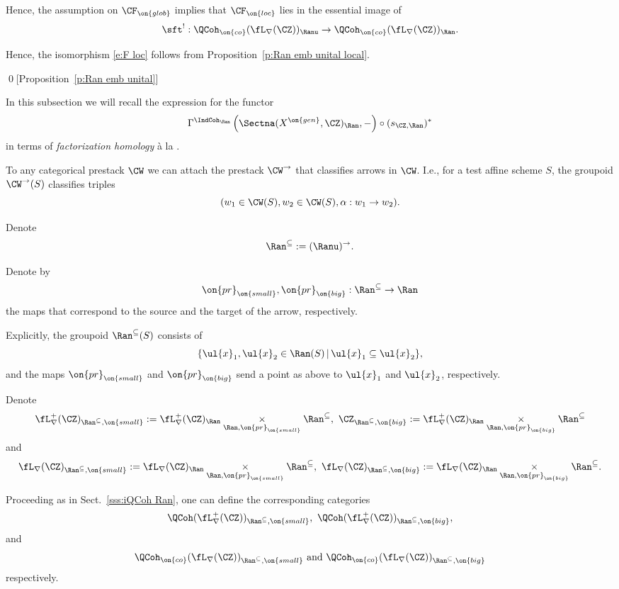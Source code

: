 \documentclass[9pt]{amsart}
\theoremstyle{remark}
\theoremstyle{definition}
\theoremstyle{remark}
\newcommand{\secref}[1]{Sect.~\ref{#1}}
\newcommand{\propref}[1]{Proposition~\ref{#1}}
\numberwithin{equation}{section}
\begin{document}
\sssec{}

Hence, the assumption on $\CF_{\on{glob}}$ implies that $\CF_{\on{loc}}$ lies in the essential image of 
$$\sft^!:\QCoh_{\on{co}}(\fL_\nabla(\CZ))_\Ranu\to \QCoh_{\on{co}}(\fL_\nabla(\CZ))_\Ran.$$

Hence, the isomorphism \eqref{e:F loc} follows from \propref{p:Ran emb unital local}. 

\qed[\propref{p:Ran emb unital}]

 \label{ss:fact hom}

In this subsection we will recall the expression for the functor 
$$\Gamma^{\IndCoh_\Ran}\left(\Sectna(X^{\on{gen}},\CZ)_\Ran,-\right)\circ (s_{\CZ,\Ran})^*$$
in terms of \emph{factorization homology} \`a la \cite[Sect. 4.6]{BD1}.

\sssec{} \label{sss:arr}

To any categorical prestack $\CW$ we can attach the prestack $\CW^\to$ that classifies arrows in $\CW$. I.e.,
for a test affine scheme $S$, the groupoid $\CW^\to(S)$ classifies triples
$$(w_1\in \CW(S),w_2\in \CW(S),\alpha:w_1\to w_2).$$

\sssec{}

Denote 
$$\Ran^{\subseteq}:=(\Ranu)^\to.$$

Denote by 
$$\on{pr}_{\on{small}},\on{pr}_{\on{big}}:\Ran^{\subseteq}\to \Ran$$
the maps 
that correspond to the source and the target of the arrow, respectively.

\medskip

Explicitly, the groupoid $\Ran^{\subseteq}(S)$ consists of 
$$\{\ul{x}_1,\ul{x}_2\in \Ran(S)\,|\, \ul{x}_1\subseteq \ul{x}_2\},$$
and the maps $\on{pr}_{\on{small}}$ and $\on{pr}_{\on{big}}$ send a point
as above to $\ul{x}_1$ and $\ul{x}_2$, respectively.

\sssec{}

Denote 
$$\fL_\nabla^+(\CZ)_{\Ran^{\subseteq},\on{small}}:=\fL_\nabla^+(\CZ)_\Ran\underset{\Ran,\on{pr}_{\on{small}}}\times \Ran^{\subseteq},\,\,
\CZ_{\Ran^{\subseteq},\on{big}}:=\fL_\nabla^+(\CZ)_\Ran\underset{\Ran,\on{pr}_{\on{big}}}\times \Ran^{\subseteq}$$
and
$$\fL_\nabla(\CZ)_{\Ran^{\subseteq},\on{small}}:=\fL_\nabla(\CZ)_\Ran\underset{\Ran,\on{pr}_{\on{small}}}\times \Ran^{\subseteq},\,\, 
\fL_\nabla(\CZ)_{\Ran^{\subseteq},\on{big}}:=\fL_\nabla(\CZ)_\Ran\underset{\Ran,\on{pr}_{\on{big}}}\times \Ran^{\subseteq}.$$

Proceeding as in \secref{sss:iQCoh Ran}, one can define the corresponding categories
$$\QCoh(\fL^+_\nabla(\CZ))_{\Ran^{\subseteq},\on{small}},\,\, \QCoh(\fL^+_\nabla(\CZ))_{\Ran^{\subseteq},\on{big}},$$
and 
$$\QCoh_{\on{co}}(\fL_\nabla(\CZ))_{\Ran^{\subseteq},\on{small}} \text{ and } \QCoh_{\on{co}}(\fL_\nabla(\CZ))_{\Ran^{\subseteq},\on{big}}$$
respectively.
\end{document}
